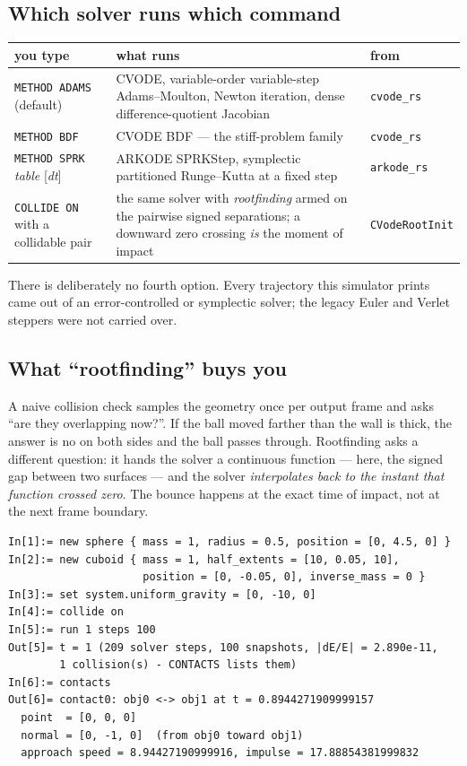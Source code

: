 \documentclass[11pt]{article}
\newcommand{\kw}[1]{\texttt{\uppercase{#1}}}
\newcommand{\code}[1]{\texttt{#1}}
\begin{document}
\subsection{Which solver runs which command}

\begin{center}
\begin{tabular}{p{4.6cm}p{7.4cm}p{2.2cm}}
\textbf{you type} & \textbf{what runs} & \textbf{from}\\\hline
\kw{method adams} (default) & CVODE, variable-order variable-step
Adams--Moulton, Newton iteration, dense difference-quotient Jacobian &
\code{cvode\_rs}\\
\kw{method bdf} & CVODE BDF --- the stiff-problem family &
\code{cvode\_rs}\\
\kw{method sprk} \emph{table} [\emph{dt}] & ARKODE SPRKStep, symplectic
partitioned Runge--Kutta at a fixed step & \code{arkode\_rs}\\
\kw{collide on} with a collidable pair & the same solver with
\emph{rootfinding} armed on the pairwise signed separations; a downward
zero crossing \emph{is} the moment of impact &
\code{CVodeRootInit}\\
\end{tabular}
\end{center}

There is deliberately no fourth option. Every trajectory this simulator
prints came out of an error-controlled or symplectic solver; the legacy
Euler and Verlet steppers were not carried over.

\subsection{What ``rootfinding'' buys you}

A naive collision check samples the geometry once per output frame and
asks ``are they overlapping now?''. If the ball moved farther than the
wall is thick, the answer is no on both sides and the ball passes
through. Rootfinding asks a different question: it hands the solver a
continuous function --- here, the signed gap between two surfaces ---
and the solver \emph{interpolates back to the instant that function
crossed zero}. The bounce happens at the exact time of impact, not at
the next frame boundary.

\begin{lstlisting}
In[1]:= new sphere { mass = 1, radius = 0.5, position = [0, 4.5, 0] }
In[2]:= new cuboid { mass = 1, half_extents = [10, 0.05, 10],
                     position = [0, -0.05, 0], inverse_mass = 0 }
In[3]:= set system.uniform_gravity = [0, -10, 0]
In[4]:= collide on
In[5]:= run 1 steps 100
Out[5]= t = 1 (209 solver steps, 100 snapshots, |dE/E| = 2.890e-11,
        1 collision(s) - CONTACTS lists them)
In[6]:= contacts
Out[6]= contact0: obj0 <-> obj1 at t = 0.8944271909999157
  point  = [0, 0, 0]
  normal = [0, -1, 0]  (from obj0 toward obj1)
  approach speed = 8.94427190999916, impulse = 17.88854381999832
\end{lstlisting}
\end{document}
